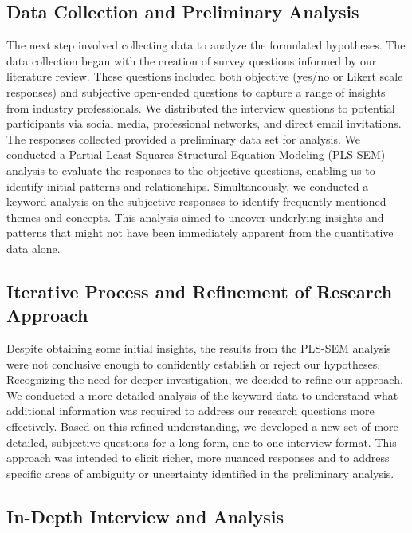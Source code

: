 
\subsection{Data Collection and Preliminary Analysis}

The next step involved collecting data to analyze the formulated hypotheses. The data collection began with the creation of survey questions informed by our literature review. These questions included both objective (yes/no or Likert scale responses) and subjective open-ended questions to capture a range of insights from industry professionals. We distributed the interview questions to potential participants via social media, professional networks, and direct email invitations. The responses collected provided a preliminary data set for analysis. We conducted a Partial Least Squares Structural Equation Modeling (PLS-SEM) analysis to evaluate the responses to the objective questions, enabling us to identify initial patterns and relationships. Simultaneously, we conducted a keyword analysis on the subjective responses to identify frequently mentioned themes and concepts. This analysis aimed to uncover underlying insights and patterns that might not have been immediately apparent from the quantitative data alone.

\subsection{Iterative Process and Refinement of Research Approach}

Despite obtaining some initial insights, the results from the PLS-SEM analysis were not conclusive enough to confidently establish or reject our hypotheses. Recognizing the need for deeper investigation, we decided to refine our approach. We conducted a more detailed analysis of the keyword data to understand what additional information was required to address our research questions more effectively. Based on this refined understanding, we developed a new set of more detailed, subjective questions for a long-form, one-to-one interview format. This approach was intended to elicit richer, more nuanced responses and to address specific areas of ambiguity or uncertainty identified in the preliminary analysis.

\subsection{In-Depth Interview and Analysis}

